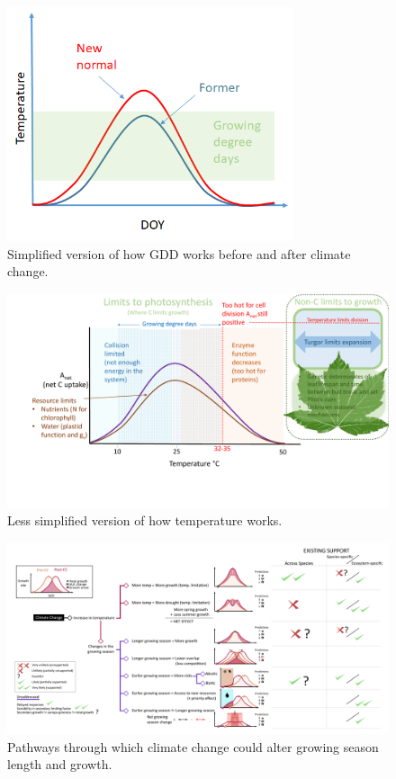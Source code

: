 \documentclass[11pt]{article}
\begin{document}
\begin{figure}[h!]
\includegraphics[width=0.75\textwidth]{..//figures/simpletempcurve_fromlucidboard.png}
\caption{Simplified version of how GDD works before and after climate change.}
\label{fig:simpletemp}
\end{figure}


\begin{figure}[h!]
\includegraphics[width=1\textwidth]{..//figures/grephonfig.pdf}
\caption{Less simplified version of how temperature works.}
\label{fig:temperaturecomplex}
\end{figure}


\begin{figure}[h!]
\includegraphics[width=1\textwidth]{..//figures/some conceptual figure2.0.png}
\caption{Pathways through which climate change could alter growing season length and growth.}
\label{fig:pathways}
\end{figure}
\end{document}

